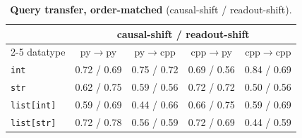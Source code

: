 \begin{table}[ht]\centering\small
\begin{tabular}{lcccc}
\toprule
& \multicolumn{4}{c}{causal-shift / readout-shift} \\
\cmidrule(lr){2-5}
datatype & py$\to$py & py$\to$cpp & cpp$\to$py & cpp$\to$cpp \\
\midrule
\texttt{int} & 0.72 / 0.69 & 0.75 / 0.72 & 0.69 / 0.56 & 0.84 / 0.69 \\
\texttt{str} & 0.62 / 0.75 & 0.59 / 0.56 & 0.72 / 0.72 & 0.50 / 0.56 \\
\texttt{list[int]} & 0.59 / 0.69 & 0.44 / 0.66 & 0.66 / 0.75 & 0.59 / 0.69 \\
\texttt{list[str]} & 0.72 / 0.78 & 0.56 / 0.59 & 0.72 / 0.69 & 0.44 / 0.59 \\
\bottomrule
\end{tabular}
\caption{\textbf{Query transfer, order-matched} (causal-shift / readout-shift).}
\label{tab:q-matched}
\end{table}

